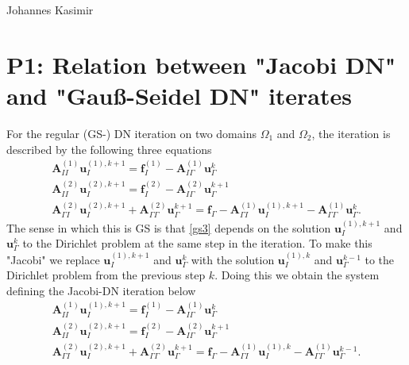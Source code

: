 \documentclass[12pt,a4paper]{report}
\begin{document}
\noindent Johannes Kasimir
	

	
\section*{P1: Relation between "Jacobi DN" and "Gau\ss-Seidel DN" iterates }

For the regular (GS-) DN iteration on two domains $\Omega_1$ and $\Omega_2$, the iteration is described by the following three equations
\begin{align}
\label{gs1}
\mathbf{A}_{II}^{(1)} \mathbf{u}_I^{(1),k+1} = \mathbf{f}^{(1)}_I - \mathbf{A}_{I\Gamma}^{(1)}\mathbf{u}^k_\Gamma \\
\label{gs2}
\mathbf{A}_{II}^{(2)} \mathbf{u}_I^{(2),k+1} = \mathbf{f}^{(2)}_I - \mathbf{A}_{I\Gamma}^{(2)}\mathbf{u}^{k+1}_\Gamma \\
\label{gs3}
\mathbf{A}_{\Gamma I}^{(2)} \mathbf{u}_I^{(2),k+1} + \mathbf{A}_{\Gamma \Gamma}^{(2)} \mathbf{u}_\Gamma^{k+1}= \mathbf{f}_\Gamma - \mathbf{A}_{\Gamma I}^{(1)}\mathbf{u}^{(1),k+1}_I - \mathbf{A}_{\Gamma \Gamma}^{(1)} \mathbf{u}_\Gamma^{k}.
\end{align}
The sense in which this is GS is that \eqref{gs3} depends on the solution $\mathbf{u}_I^{(1),k+1}$ and $\mathbf{u}_\Gamma^{k}$ to the Dirichlet problem at the same step in the iteration. To make this "Jacobi" we replace $\mathbf{u}_I^{(1),k+1}$ and $\mathbf{u}_\Gamma^{k}$ with the solution $\mathbf{u}_I^{(1),k}$ and $\mathbf{u}_\Gamma^{k-1}$ to the Dirichlet problem from the previous step $k$. Doing this we obtain the system defining the Jacobi-DN iteration below
\begin{align}
\label{j1}
\mathbf{A}_{II}^{(1)} \mathbf{u}_I^{(1),k+1} = \mathbf{f}^{(1)}_I - \mathbf{A}_{I\Gamma}^{(1)}\mathbf{u}^k_\Gamma \\
\label{j2}
\mathbf{A}_{II}^{(2)} \mathbf{u}_I^{(2),k+1} = \mathbf{f}^{(2)}_I - \mathbf{A}_{I\Gamma}^{(2)}\mathbf{u}^{k+1}_\Gamma \\
\label{j3}
\mathbf{A}_{\Gamma I}^{(2)} \mathbf{u}_I^{(2),k+1} + \mathbf{A}_{\Gamma \Gamma}^{(2)} \mathbf{u}_\Gamma^{k+1}= \mathbf{f}_\Gamma - \mathbf{A}_{\Gamma I}^{(1)}\mathbf{u}^{(1),k}_I - \mathbf{A}_{\Gamma \Gamma}^{(1)} \mathbf{u}_\Gamma^{k-1}.
\end{align}
\end{document}
